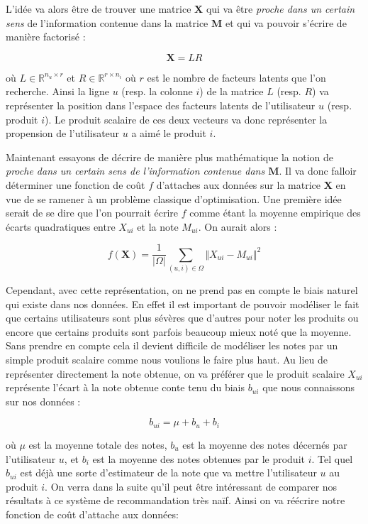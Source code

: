 \documentclass[10pt,a4paper]{article}
\begin{document}
L'idée va alors être de trouver une matrice $\textbf{X}$ qui va être \textit{proche dans un certain sens} de l'information contenue dans la matrice $\textbf{M}$ et qui va pouvoir s'écrire de manière factorisé :

$$ \textbf{X} = LR $$

où $L \in \mathbb{R}^{n_u\times r}$ et $R \in \mathbb{R}^{r\times n_i}$ où $r$ est le nombre de facteurs latents que l'on recherche. Ainsi la ligne $u$ (resp. la colonne $i$) de la matrice $L$ (resp. $R$) va représenter la position dans l'espace des facteurs latents de l'utilisateur $u$ (resp. produit $i$). Le produit scalaire de ces deux vecteurs va donc représenter la propension de l'utilisateur $u$ a aimé le produit $i$. 

Maintenant essayons de décrire de manière plus mathématique la notion de \textit{proche dans un certain sens de l'information contenue dans $\textbf{M}$}. Il va donc falloir déterminer une fonction de coût $f$ d'attaches aux données sur la matrice $\textbf{X}$ en vue de se ramener à un problème classique d'optimisation. Une première idée serait de se dire que l'on pourrait écrire $f$ comme étant la moyenne empirique des écarts quadratiques entre $X_{ui}$ et la note $M_{ui}$. On aurait alors :

$$ f(\textbf{X}) = \frac{1}{| \Omega |}\sum_{(u,i)\in\Omega}\Vert X_{ui}-M_{ui} \Vert^2 $$

Cependant, avec cette représentation, on ne prend pas en compte le biais naturel qui existe dans nos données. En effet il est important de pouvoir modéliser le fait que certains utilisateurs sont plus sévères que d'autres pour noter les produits ou encore que certains produits sont parfois beaucoup mieux noté que la moyenne. Sans prendre en compte cela il devient difficile de modéliser les notes par un simple produit scalaire comme nous voulions le faire plus haut. Au lieu de représenter directement la note obtenue, on va préférer que le produit scalaire $X_{ui}$ représente l'écart à la note obtenue conte tenu du biais $b_{ui}$ que nous connaissons sur nos données :

$$b_{ui} = \mu + b_u  + b_i $$ 

où $\mu$ est la moyenne totale des notes, $b_u$ est la moyenne des notes décernés par l'utilisateur $u$, et $b_i$ est la moyenne des notes obtenues par le produit $i$. Tel quel $b_{ui}$ est déjà une sorte d'estimateur de la note que va mettre l'utilisateur $u$ au produit $i$. On verra dans la suite qu'il peut être intéressant de comparer nos résultats à ce système de recommandation très naïf. Ainsi on va réécrire notre fonction de coût d'attache aux données:
\end{document}
